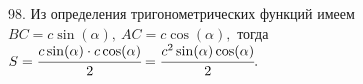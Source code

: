 98. Из определения тригонометрических функций имеем $BC=c\sin(\alpha),\ AC=c\cos(\alpha),$ тогда $S=\cfrac{c\sin(\alpha)\cdot c\cos(\alpha)}{2}=\cfrac{c^2\sin(\alpha)\cos(\alpha)}{2}.$\\
